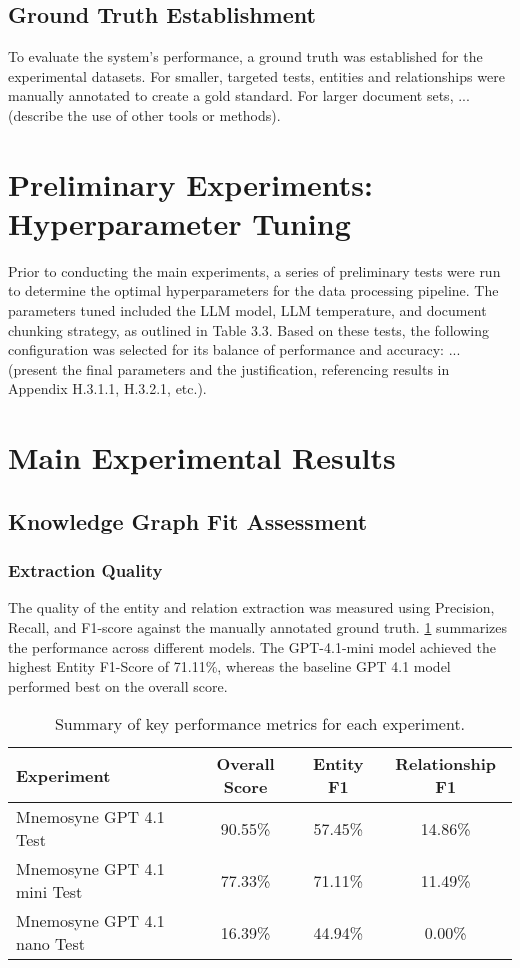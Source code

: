 \subsection{Ground Truth Establishment}
To evaluate the system's performance, a ground truth was established for the experimental datasets. For smaller, targeted tests, entities and relationships were manually annotated to create a gold standard. For larger document sets, ... (describe the use of other tools or methods).

\section{Preliminary Experiments: Hyperparameter Tuning}
\label{sec:hyperparameter_tuning}
Prior to conducting the main experiments, a series of preliminary tests were run to determine the optimal hyperparameters for the data processing pipeline. The parameters tuned included the LLM model, LLM temperature, and document chunking strategy, as outlined in Table 3.3. Based on these tests, the following configuration was selected for its balance of performance and accuracy: ... (present the final parameters and the justification, referencing results in Appendix H.3.1.1, H.3.2.1, etc.).

\section{Main Experimental Results}
\label{sec:main_results}

\subsection{Knowledge Graph Fit Assessment}
\label{subsec:kg_fit}
\subsubsection{Extraction Quality}
The quality of the entity and relation extraction was measured using Precision, Recall, and F1-score against the manually annotated ground truth. \cref{tab:extraction_results} summarizes the performance across different models. The GPT-4.1-mini model achieved the highest Entity F1-Score of 71.11\%, whereas the baseline GPT 4.1 model performed best on the overall score.

\begin{table}[h!]
\centering
\caption{Summary of key performance metrics for each experiment.}
\label{tab:extraction_results}
\begin{tabular}{|l|c|c|c|}
\hline
\textbf{Experiment} & \textbf{Overall Score} & \textbf{Entity F1} & \textbf{Relationship F1} \\
\hline
Mnemosyne GPT 4.1 Test & 90.55\% & 57.45\% & 14.86\% \\
Mnemosyne GPT 4.1 mini Test & 77.33\% & 71.11\% & 11.49\% \\
Mnemosyne GPT 4.1 nano Test & 16.39\% & 44.94\% & 0.00\% \\
\hline
\end{tabular}
\end{table}

